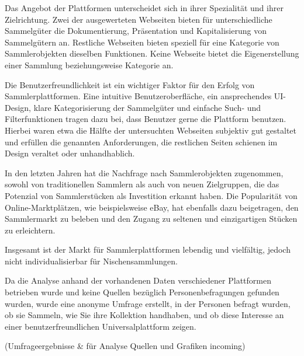Das Angebot der Plattformen unterscheidet sich in ihrer Spezialität und ihrer Zielrichtung.
Zwei der ausgewerteten Webseiten bieten für unterschiedliche Sammelgüter die Dokumentierung, Präsentation und Kapitalisierung von Sammelgütern an.
Restliche Webseiten bieten speziell für eine Kategorie von Sammlerobjekten dieselben Funktionen.
Keine Webseite bietet die Eigenerstellung einer Sammlung beziehungsweise Kategorie an. \par

Die Benutzerfreundlichkeit ist ein wichtiger Faktor für den Erfolg von Sammlerplattformen.
Eine intuitive Benutzeroberfläche, ein ansprechendes UI-Design, klare Kategorisierung der Sammelgüter und einfache Such- und Filterfunktionen tragen dazu bei, dass Benutzer gerne die Plattform benutzen.
Hierbei waren etwa die Hälfte der untersuchten Webseiten subjektiv gut gestaltet und erfüllen die genannten Anforderungen, die restlichen Seiten schienen im Design veraltet oder unhandhablich. \par

In den letzten Jahren hat die Nachfrage nach Sammlerobjekten zugenommen, sowohl von traditionellen Sammlern als auch von neuen Zielgruppen, die das Potenzial von Sammlerstücken als Investition erkannt haben.
Die Popularität von Online-Marktplätzen, wie beispielsweise eBay, hat ebenfalls dazu beigetragen, den Sammlermarkt zu beleben und den Zugang zu seltenen und einzigartigen Stücken zu erleichtern. \par
Insgesamt ist der Markt für Sammlerplattformen lebendig und vielfältig, jedoch nicht individualisierbar für Nischensammlungen. \par
Da die Analyse anhand der vorhandenen Daten verschiedener Plattformen betrieben wurde und keine Quellen bezüglich Personenbefragungen gefunden wurden, wurde eine anonyme Umfrage erstellt, in der Personen befragt wurden, ob sie Sammeln, wie Sie ihre Kollektion handhaben, und ob diese Interesse an einer benutzerfreundlichen Universalplattform zeigen. \linebreak

(Umfrageergebnisse \& für Analyse Quellen und Grafiken incoming)

